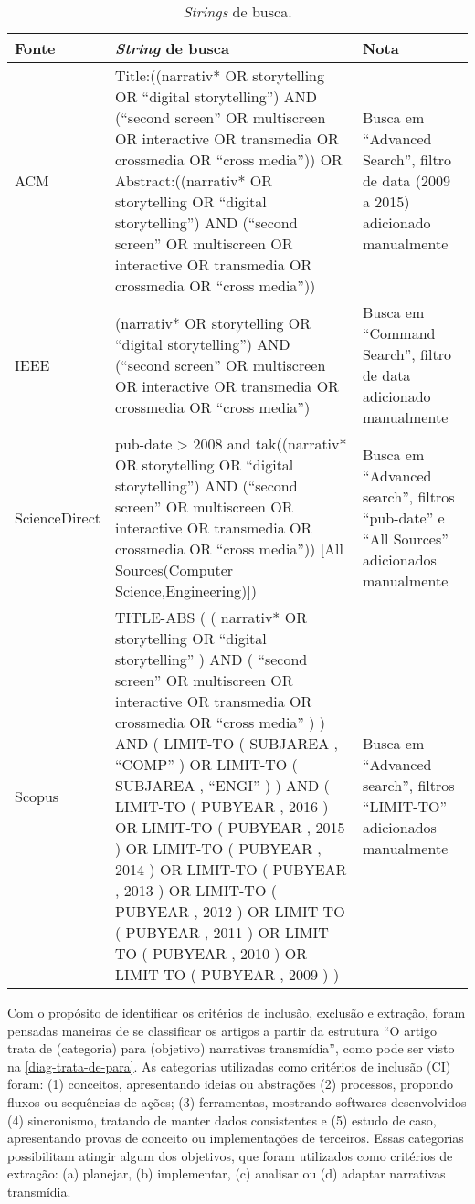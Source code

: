 \documentclass[
article,			%
11pt,				%
oneside,			%
a4paper,			%
english,			%
brazil,				%
sumario=tradicional
]{abntex2}
\begin{document}
  \begin{table}[htb]
    \ABNTEXfontereduzida
    \caption[\textit{Strings} de busca]{\textit{Strings} de busca.}
    \label{tab-queries2}
    \begin{tabular}{p{2.0cm}|p{9.3cm}|p{2.8cm}}
      \textbf{Fonte} & \textbf{\textit{String} de busca} & \textbf{Nota} \\
      \hline
      ACM & Title:((narrativ* OR storytelling OR ``digital storytelling'') AND (``second screen'' OR multiscreen OR interactive OR transmedia OR crossmedia OR ``cross media'')) OR Abstract:((narrativ* OR storytelling OR ``digital storytelling'') AND (``second screen'' OR multiscreen OR interactive OR transmedia OR crossmedia OR ``cross media'')) & Busca em ``Advanced Search'', filtro de data (2009 a 2015) adicionado manualmente \\
      \hline
      IEEE & (narrativ* OR storytelling OR ``digital storytelling'') AND (``second screen'' OR multiscreen OR interactive OR transmedia OR crossmedia OR ``cross media'') & Busca em ``Command Search'', filtro de data adicionado manualmente \\
      \hline
      ScienceDirect & pub-date > 2008 and tak((narrativ* OR storytelling OR ``digital storytelling'') AND (``second screen'' OR multiscreen OR interactive OR transmedia OR crossmedia OR ``cross media'')) [All Sources(Computer Science,Engineering)]) & Busca em ``Advanced search'', filtros ``pub-date'' e ``All Sources'' adicionados manualmente \\
      \hline
      Scopus & TITLE-ABS ( ( narrativ*  OR  storytelling  OR  ``digital storytelling'' )  AND  ( ``second screen''  OR  multiscreen  OR  interactive  OR  transmedia  OR  crossmedia  OR  ``cross media'' ) )  AND  ( LIMIT-TO ( SUBJAREA ,  ``COMP'' )  OR  LIMIT-TO ( SUBJAREA ,  ``ENGI'' ) )  AND  ( LIMIT-TO ( PUBYEAR ,  2016 )  OR  LIMIT-TO ( PUBYEAR ,  2015 )  OR  LIMIT-TO ( PUBYEAR ,  2014 )  OR  LIMIT-TO ( PUBYEAR ,  2013 )  OR  LIMIT-TO ( PUBYEAR ,  2012 )  OR  LIMIT-TO ( PUBYEAR ,  2011 )  OR  LIMIT-TO ( PUBYEAR ,  2010 )  OR  LIMIT-TO ( PUBYEAR ,  2009 ) ) & Busca em ``Advanced search'', filtros ``LIMIT-TO'' adicionados manualmente \\
    \end{tabular}
  \end{table}

  Com o propósito de identificar os critérios de inclusão, exclusão e extração, foram pensadas maneiras de se classificar os artigos a partir da estrutura ``O artigo trata de (categoria) para (objetivo) narrativas transmídia'', como pode ser visto na \autoref{diag-trata-de-para}.
  As categorias utilizadas como critérios de inclusão (CI) foram: (1) conceitos, apresentando ideias ou abstrações (2) processos, propondo fluxos ou sequências de ações; (3) ferramentas, mostrando softwares desenvolvidos (4) sincronismo, tratando de manter dados consistentes e (5) estudo de caso, apresentando provas de conceito ou implementações de terceiros. Essas categorias possibilitam atingir algum dos objetivos, que foram utilizados como critérios de extração: (a) planejar, (b) implementar, (c) analisar ou (d) adaptar narrativas transmídia.
\end{document}
